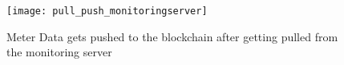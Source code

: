 \begin{figure}[htb]
    \centering
    \texttt{[image: pull\_push\_monitoringserver]}
    \caption{Meter Data gets pushed to the blockchain after getting pulled from the monitoring server}
    \label{fig:pull_push_monitoringserver}
\end{figure}